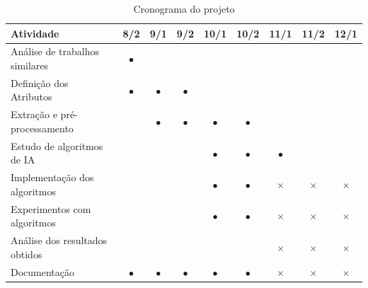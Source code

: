 \documentclass[oneside,openright,12pt]{ufsm_2015} %
\begin{document}
    \begin{table}[ht]
    \centering
    \caption{Cronograma do projeto}
    \label{tab:cronograma}
    \begin{tabular}{|l|c|c|c|c|c|c|c|c|}
    \hline
    \textbf{Atividade} & \textbf{8/2} & \textbf{9/1} & \textbf{9/2} & \textbf{10/1} & \textbf{10/2} & \textbf{11/1} & \textbf{11/2} & \textbf{12/1} \\ \hline
    Análise de trabalhos similares & \cellcolor{gray!20}$\bullet$ &  &  &  &  &  &  &  \\ \hline
    Definição dos Atributos & \cellcolor{gray!20}$\bullet$ & \cellcolor{gray!20}$\bullet$ & \cellcolor{gray!20}$\bullet$ &  &  &  &  &  \\ \hline
    Extração e pré-processamento &  & \cellcolor{gray!20}$\bullet$ & \cellcolor{gray!20}$\bullet$ & \cellcolor{gray!20}$\bullet$ & \cellcolor{gray!20}$\bullet$ &  &  &  \\ \hline
    Estudo de algoritmos de IA &  &  &  & \cellcolor{gray!20}$\bullet$ & \cellcolor{gray!20}$\bullet$ & \cellcolor{gray!20}$\bullet$ &  &  \\ \hline
    Implementação dos algoritmos &  &  &  & \cellcolor{gray!20}$\bullet$ & \cellcolor{gray!20}$\bullet$ & $\times$ & $\times$ & $\times$ \\ \hline
    Experimentos com algoritmos &  &  &  & \cellcolor{gray!20}$\bullet$ & \cellcolor{gray!20}$\bullet$ & $\times$ & $\times$ & $\times$ \\ \hline
    Análise dos resultados obtidos &  &  &  &  &  & $\times$ & $\times$ & $\times$ \\ \hline
    Documentação & \cellcolor{gray!20}$\bullet$ & \cellcolor{gray!20}$\bullet$ & \cellcolor{gray!20}$\bullet$ & \cellcolor{gray!20}$\bullet$ & \cellcolor{gray!20}$\bullet$ & $\times$ & $\times$ & $\times$ \\ \hline
    \end{tabular}
    \end{table}
    
\end{document}
